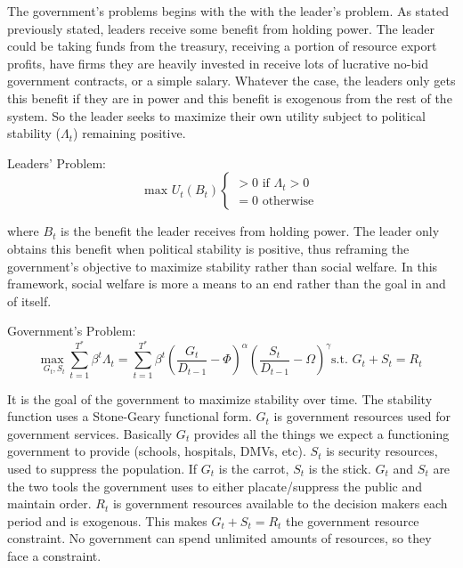 \documentclass[12pt]{article}
\begin{document}
\begin{spacing}{1.5}
The government's problems begins with the with the leader's problem. As stated previously stated, leaders receive some benefit from holding power. The leader could be taking funds from the treasury, receiving a portion of resource export profits, have firms they are heavily invested in receive lots of lucrative no-bid government contracts, or a simple salary. Whatever the case, the leaders only gets this benefit if they are in power and this benefit is exogenous from the rest of the system. So the leader seeks to maximize their own utility subject to political stability ($\Lambda_t$) remaining positive. 


\vspace{.5 em}
\noindent Leaders' Problem:
\begin{equation}
	 \text{max } U_t(B_t) \begin{cases}
		>0 \text{ if } \Lambda_t > 0 \\
		= 0 \text{ otherwise} 	
	\end{cases}
\end{equation} 

\noindent where $B_t$ is the benefit the leader receives from holding power. The leader only obtains this benefit when political stability is positive, thus reframing the government's objective to maximize stability rather than social welfare. In this framework, social welfare is more a means to an end rather than the goal in and of itself. 


\vspace{.5 em}

\noindent Government's Problem:
\begin{equation}
{\underset{G_t,S_t}{\text{max }}} \sum\limits_{t=1}^{T^*} \beta^t {\Lambda}_t = \sum\limits_{t=1}^{T^*} \beta^t\left(\frac{G_t}{D_{t-1}}-\Phi\right)^\alpha \left(\frac{S_t}{D_{t-1}}-\Omega\right)^\gamma   \text{s.t. } G_t+S_t=R_t
\end{equation}

It is the goal of the government to maximize stability over time. The stability function uses a Stone-Geary functional form. $G_t$ is government resources used for government services. Basically $G_t$ provides all the things we expect a functioning government to provide (schools, hospitals, DMVs, etc). $S_t$ is security resources, used to suppress the population. If $G_t$ is the carrot, $S_t$ is the stick. $G_t$ and $S_t$ are the two tools the government uses to either placate/suppress the public and maintain order. $R_t$ is government resources available to the decision makers each period and is exogenous. This makes $G_t+S_t=R_t$ the government resource constraint. No government can spend unlimited amounts of resources, so they face a constraint. 


\end{spacing}
\end{document}
